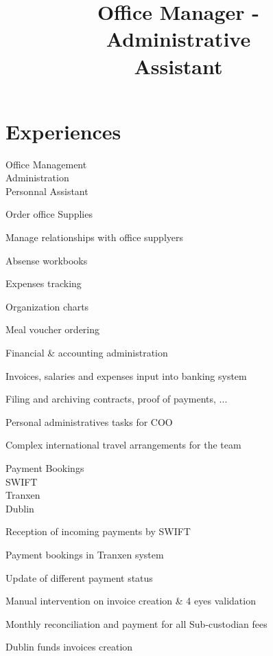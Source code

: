 \documentclass[a4paper,11pt]{cv4tw}%
\title{Office Manager -\\Administrative\\Assistant}
\begin{document}



	\section{Experiences}

	{Office Management\\Administration\\Personnal Assistant}
		{
		\begin{missions}
			\item Order office Supplies
			\item Manage relationships with office supplyers
			\item Absense workbooks
			\item Expenses tracking
			\item Organization charts
			\item Meal voucher ordering
			\item Financial \& accounting administration
			\item Invoices, salaries and expenses input into banking system
			\item Filing and archiving contracts, proof of payments, ...
			\item Personal administratives tasks for COO
			\item Complex international travel arrangements for the team
		\end{missions}
	}

	{Payment Bookings\\SWIFT\\Tranxen\\Dublin}
		{
		\begin{missions}
			\item Reception of incoming payments by SWIFT
			\item Payment bookings in Tranxen system
			\item Update of different payment status
			\item Manual intervention on invoice creation \& 4 eyes validation
			\item Monthly reconciliation and payment for all Sub-custodian fees
			\item Dublin funds invoices creation
		\end{missions}
	}
\end{document}
